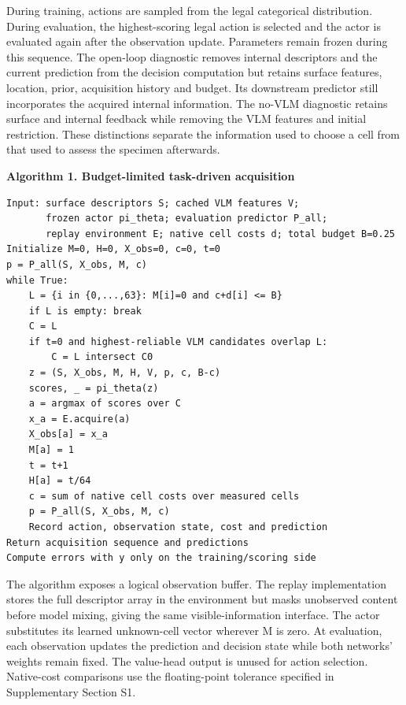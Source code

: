 During training, actions are sampled from the legal categorical distribution. During evaluation, the highest-scoring legal action is selected and the actor is evaluated again after the observation update. Parameters remain frozen during this sequence. The open-loop diagnostic removes internal descriptors and the current prediction from the decision computation but retains surface features, location, prior, acquisition history and budget. Its downstream predictor still incorporates the acquired internal information. The no-VLM diagnostic retains surface and internal feedback while removing the VLM features and initial restriction. These distinctions separate the information used to choose a cell from that used to assess the specimen afterwards.

\begin{minipage}{\linewidth}

\textbf{Algorithm 1. Budget-limited task-driven acquisition}

\begin{verbatim}
Input: surface descriptors S; cached VLM features V;
       frozen actor pi_theta; evaluation predictor P_all;
       replay environment E; native cell costs d; total budget B=0.25
Initialize M=0, H=0, X_obs=0, c=0, t=0
p = P_all(S, X_obs, M, c)
while True:
    L = {i in {0,...,63}: M[i]=0 and c+d[i] <= B}
    if L is empty: break
    C = L
    if t=0 and highest-reliable VLM candidates overlap L:
        C = L intersect C0
    z = (S, X_obs, M, H, V, p, c, B-c)
    scores, _ = pi_theta(z)
    a = argmax of scores over C
    x_a = E.acquire(a)
    X_obs[a] = x_a
    M[a] = 1
    t = t+1
    H[a] = t/64
    c = sum of native cell costs over measured cells
    p = P_all(S, X_obs, M, c)
    Record action, observation state, cost and prediction
Return acquisition sequence and predictions
Compute errors with y only on the training/scoring side
\end{verbatim}

\end{minipage}

The algorithm exposes a logical observation buffer. The replay implementation stores the full descriptor array in the environment but masks unobserved content before model mixing, giving the same visible-information interface. The actor substitutes its learned unknown-cell vector wherever M is zero. At evaluation, each observation updates the prediction and decision state while both networks' weights remain fixed. The value-head output is unused for action selection. Native-cost comparisons use the floating-point tolerance specified in Supplementary Section S1.

